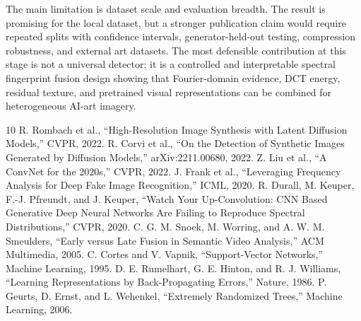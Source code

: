 ﻿\documentclass[10pt,twocolumn]{article}
\begin{document}
The main limitation is dataset scale and evaluation breadth. The result is promising for the local dataset, but a stronger publication claim would require repeated splits with confidence intervals, generator-held-out testing, compression robustness, and external art datasets. The most defensible contribution at this stage is not a universal detector; it is a controlled and interpretable spectral fingerprint fusion design showing that Fourier-domain evidence, DCT energy, residual texture, and pretrained visual representations can be combined for heterogeneous AI-art imagery.

\begin{thebibliography}{10}
 R. Rombach et al., ``High-Resolution Image Synthesis with Latent Diffusion Models,'' CVPR, 2022.
 R. Corvi et al., ``On the Detection of Synthetic Images Generated by Diffusion Models,'' arXiv:2211.00680, 2022.
 Z. Liu et al., ``A ConvNet for the 2020s,'' CVPR, 2022.
 J. Frank et al., ``Leveraging Frequency Analysis for Deep Fake Image Recognition,'' ICML, 2020.
 R. Durall, M. Keuper, F.-J. Pfreundt, and J. Keuper, ``Watch Your Up-Convolution: CNN Based Generative Deep Neural Networks Are Failing to Reproduce Spectral Distributions,'' CVPR, 2020.
 C. G. M. Snoek, M. Worring, and A. W. M. Smeulders, ``Early versus Late Fusion in Semantic Video Analysis,'' ACM Multimedia, 2005.
 C. Cortes and V. Vapnik, ``Support-Vector Networks,'' Machine Learning, 1995.
 D. E. Rumelhart, G. E. Hinton, and R. J. Williams, ``Learning Representations by Back-Propagating Errors,'' Nature, 1986.
 P. Geurts, D. Ernst, and L. Wehenkel, ``Extremely Randomized Trees,'' Machine Learning, 2006.
\end{thebibliography}
\end{document}
